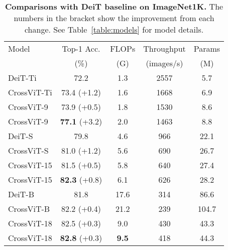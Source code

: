 \documentclass[10pt,twocolumn,letterpaper]{article}
\def\ours{CrossViT\xspace}
\begin{document}
%
 \begin{table}[t]
    \centering
    \begin{adjustbox}{max width=\linewidth}
    \begin{tabular}{l|cccc}
        \toprule
             Model   & Top-1 Acc. & FLOPs & Throughput & Params \\ 
                     & (\%) &  (G) & (images/s) & (M) \\
        \midrule
             DeiT-Ti  & 72.2 & 1.3 & 2557 & 5.7 \\
            \ours-Ti & 73.4 (+1.2) & 1.6 & 1668 & 6.9 \\ 
\ours-9 & 73.9 (+0.5) & 1.8 & 1530 & 8.6 \\
             \ours-9 & \textbf{77.1} (+3.2) & 2.0 & 1463 & 8.8 \\






\midrule
            DeiT-S  &  79.8 & 4.6 & 966 & 22.1 \\
            \ours-S &  81.0 (+1.2) & 5.6 & 690 & 26.7 \\
            \ours-15&  81.5 (+0.5) & 5.8 & 640 & 27.4 \\
            \ours-15 & \textbf{82.3} (+0.8) & 6.1 & 626 & 28.2 \\ 
            \midrule


DeiT-B  &  81.8 & 17.6 & 314 & 86.6 \\
            \ours-B &  82.2 (+0.4) & 21.2 & 239 & 104.7\\
\ours-18& 82.5 (+0.3) & 9.0 & 430 & 43.3 \\ 


\ours-18 & \textbf{82.8} (+0.3) & \textbf{9.5} & 418 & 44.3 \\ 
        \bottomrule
    \end{tabular}
    \end{adjustbox}
\caption{\textbf{Comparisons with DeiT baseline on ImageNet1K.} The numbers in the bracket show the improvement from each change. See Table~\ref{table:models} for model details.}
    \label{table:baseline}
\end{table}

%
\end{document}
